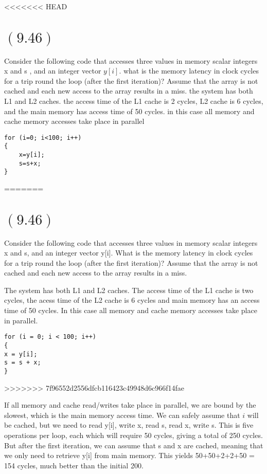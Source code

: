 \documentclass[letterpaper,12pt,titlepage]{article}
\begin{document}
<<<<<<< HEAD
\section*{$(9.46)$} Consider the following code that accesses three values in memory scalar integers x and s , and an integer vector $y[i]$. what is the memory latency in clock cycles for a trip round the loop (after the first iteration)? Assume that the array is not cached and each new access to the array results in a miss.
the system has both L1 and L2 caches. the access time of the L1 cache is 2 cycles, L2 cache is 6 cycles, and the main memory has access time of 50 cycles. in this case all memory and cache memory accesses take place in parallel
\begin{verbatim}
for (i=0; i<100; i++)
{
    x=y[i];
    s=s+x;
}
\end{verbatim}
=======
\section*{$(9.46)$} Consider the following code that accesses three values in memory scalar integers x and s, and an integer vector y[i]. What is the memory latency in clock cycles for a trip round the loop (after the first iteration)? Assume that the array is not cached and each new access to the array results in a miss.

The system has both L1 and L2 caches. The access time of the L1 cache is two cycles, the acess time of the L2 cache is 6 cycles and main memory has an access time of 50 cycles. In this case all memory and cache memory accesses take place in parallel.

\lstset{language=C}
\begin{lstlisting}
for (i = 0; i < 100; i++)
{
x = y[i];
s = s + x;
}
\end{lstlisting}

>>>>>>> 7f96552d2556dfcb116423c49948d6c966f14fae

\begin{mdframed}[style=MyFrame]
If all memory and cache read/writes take place in parallel, we are bound by the slowest, which is the main memory access time. We can safely assume that $i$ will be cached, but we need to read y[i], write x, read s, read x, write s. This is five operations per loop, each which will require 50 cycles, giving a total of 250 cycles. But after the first iteration, we can assume that s and x are cached, meaning that we only need to retrieve y[i] from main memory. This yields 50+50+2+2+50 = 154 cycles, much better than the initial 200. 
\end{mdframed}
\end{document}

